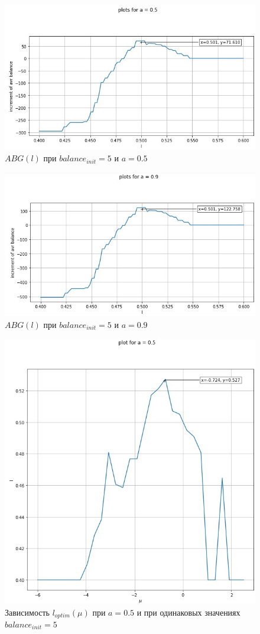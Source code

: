 \documentclass{article}
\begin{document}
\begin{figure}[H]
	\centering
	\includegraphics[width=0.6\linewidth]{assets/one_value_distribution/plot_a05.jpg}
	\caption{$ABG(l)$ при $balance_{init} = 5$ и $a = 0.5$}
\end{figure}

\begin{figure}[H]
	\centering
	\includegraphics[width=0.6\linewidth]{assets/one_value_distribution/plot_a09.jpg}
	\caption{$ABG(l)$ при $balance_{init} = 5$ и $a = 0.9$}
\end{figure}

\begin{figure}[H]
	\centering
	\includegraphics[width=0.7\linewidth]{assets/one_value_distribution/plot_mu_l_details.jpg}
	\caption{Зависимость $l_{optim}(\mu)$ при $a = 0.5$ и при одинаковых значениях $balance_{init} = 5$}
\end{figure}
\end{document}
